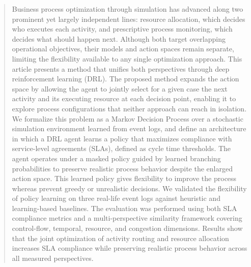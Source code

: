 \documentclass[runningheads]{llncs}
\begin{document}
\begin{abstract}
Business process optimization through simulation has advanced along two prominent yet largely independent lines: resource allocation, which decides who executes each activity, and prescriptive process monitoring, which decides what should happen next. Although both target overlapping operational objectives, their models and action spaces remain separate, limiting the flexibility available to any single optimization approach. This article presents a method that unifies both perspectives through deep reinforcement learning (DRL). The proposed method expands the action space by allowing the agent to jointly select for a given case the next activity and its executing resource at each decision point, enabling it to explore process configurations that neither approach can reach in isolation. We formalize this problem as a Markov Decision Process over a stochastic simulation environment learned from event logs, and define an architecture in which a DRL agent learns a policy that maximizes compliance with service-level agreements (SLAs), defined as cycle time thresholds. The agent operates under a masked policy guided by learned branching probabilities to preserve realistic process behavior despite the enlarged action space. This learned policy gives flexibility to improve the process whereas prevent greedy or unrealistic decisions. We validated the flexibility of policy learning on three real-life event logs against heuristic and learning-based baselines. The evaluation was performed using both SLA compliance metrics and a multi-perspective similarity framework covering control-flow, temporal, resource, and congestion dimensions. Results show that the joint optimization of activity routing and resource allocation increases SLA compliance while preserving realistic process behavior across all measured perspectives.
%

\end{abstract}
\end{document}
